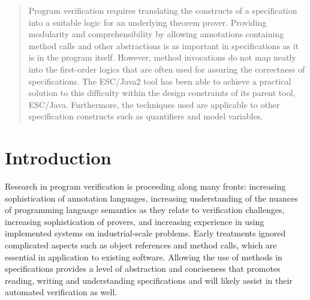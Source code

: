 \documentclass{sig-alternate}
\newif\ifpdf
\begin{document}


\date{27 March 2004}

\newcommand{\myhref}[2]{\ifpdf\href{#1}{#2}\else\htmladdnormallinkfoot{#2}{#1}\fi}

\maketitle
\begin{abstract}
Program verification requires translating the constructs of a specification 
into a suitable logic for an underlying theorem prover.   Providing modularity
and comprehensibility by allowing 
annotations containing method calls and other abstractions is as important in 
specifications as it is in the program itself.  However, method invocations do not
map neatly into the first-order logics that are often used for assuring the correctness
of specifications.  The ESC/Java2 tool
has been able to achieve a practical solution to this difficulty within the design constraints
of its parent tool, ESC/Java.  Furthermore, the techniques used are applicable to other
specification constructs such as quantifiers and model variables.

\end{abstract}




\section{Introduction}

Research in program verification is proceeding along many fronts: 
increasing sophistication of annotation languages, increasing
understanding of the nuances of programming language semantics as they
relate to verification challenges, increasing sophistication of 
provers, and increasing experience in using implemented systems on
industrial-scale problems.  Early treatments ignored complicated
aspects such as object references and method calls, which are
essential in application to existing software.  Allowing
the use of methods in specifications provides a level of abstraction 
and conciseness that
promotes reading, writing and understanding specifications and will 
likely assist in their automated verification as well.  
\end{document}
